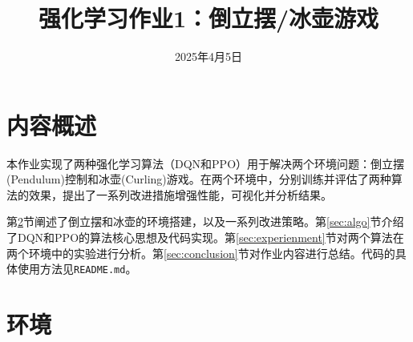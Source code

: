 \documentclass[12pt,a4paper]{article}
\title{\textbf{强化学习作业1：倒立摆/冰壶游戏}}
\date{2025年4月5日}
\begin{document}
\maketitle

\tableofcontents
\newpage


\section{内容概述}
本作业实现了两种强化学习算法（DQN和PPO）用于解决两个环境问题：倒立摆(Pendulum)控制和冰壶(Curling)游戏。在两个环境中，分别训练并评估了两种算法的效果，提出了一系列改进措施增强性能，可视化并分析结果。

第\ref{sec:env}节阐述了倒立摆和冰壶的环境搭建，以及一系列改进策略。第\ref{sec:algo}节介绍了DQN和PPO的算法核心思想及代码实现。第\ref{sec:experienment}节对两个算法在两个环境中的实验进行分析。第\ref{sec:conclusion}节对作业内容进行总结。代码的具体使用方法见\colorbox{gray!20}{\texttt{README.md}}。

\section{环境}
\label{sec:env}
\end{document}
